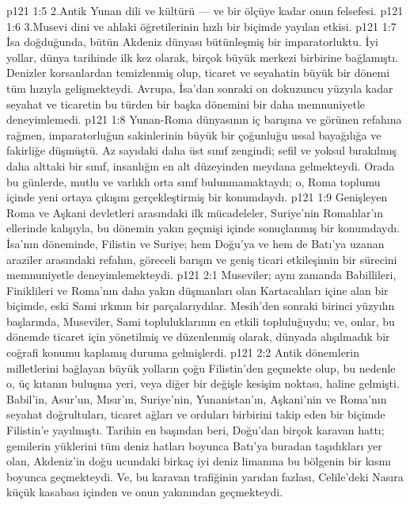 \vs p121 1:5 2.\bibnobreakspace Antik Yunan dili ve kültürü --- ve bir ölçüye kadar onun felsefesi.
\vs p121 1:6 3.\bibnobreakspace Musevi dini ve ahlaki öğretilerinin hızlı bir biçimde yayılan etkisi.
\vs p121 1:7 İsa doğduğunda, bütün Akdeniz dünyası bütünleşmiş bir imparatorluktu. İyi yollar, dünya tarihinde ilk kez olarak, birçok büyük merkezi birbirine bağlamıştı. Denizler korsanlardan temizlenmiş olup, ticaret ve seyahatin büyük bir dönemi tüm hızıyla gelişmekteydi. Avrupa, İsa’dan sonraki on dokuzuncu yüzyıla kadar seyahat ve ticaretin bu türden bir başka dönemini bir daha memnuniyetle deneyimlemedi.
\vs p121 1:8 Yunan\hyp{}Roma dünyasının iç barışına ve görünen refahına rağmen, imparatorluğun sakinlerinin büyük bir çoğunluğu ussal bayağılığa ve fakirliğe düşmüştü. Az sayıdaki daha üst sınıf zengindi; sefil ve yoksul bırakılmış daha alttaki bir sınıf, insanlığın en alt düzeyinden meydana gelmekteydi. Orada bu günlerde, mutlu ve varlıklı orta sınıf bulunmamaktaydı; o, Roma toplumu içinde yeni ortaya çıkışını gerçekleştirmiş bir konumdaydı.
\vs p121 1:9 Genişleyen Roma ve Aşkani devletleri arasındaki ilk mücadeleler, Suriye’nin Romalılar’ın ellerinde kalışıyla, bu dönemin yakın geçmişi içinde sonuçlanmış bir konumdaydı. İsa’nın döneminde, Filistin ve Suriye; hem Doğu’ya ve hem de Batı’ya uzanan araziler arasındaki refahın, göreceli barışın ve geniş ticari etkileşimin bir sürecini memnuniyetle deneyimlemekteydi.
\vs p121 2:1 Museviler; aynı zamanda Babillileri, Finiklileri ve Roma’nın daha yakın düşmanları olan Kartacalıları içine alan bir biçimde, eski Sami ırkının bir parçalarıydılar. Mesih’den sonraki birinci yüzyılın başlarında, Museviler, Sami topluluklarının en etkili topluluğuydu; ve, onlar, bu dönemde ticaret için yönetilmiş ve düzenlenmiş olarak, dünyada alışılmadık bir coğrafi konumu kaplamış duruma gelmişlerdi.
\vs p121 2:2 Antik dönemlerin milletlerini bağlayan büyük yolların çoğu Filistin’den geçmekte olup, bu nedenle o, üç kıtanın buluşma yeri, veya diğer bir değişle kesişim noktası, haline gelmişti. Babil’in, Asur’un, Mısır’ın, Suriye’nin, Yunanistan’ın, Aşkani’nin ve Roma’nın seyahat doğrultuları, ticaret ağları ve orduları birbirini takip eden bir biçimde Filistin’e yayılmıştı. Tarihin en başından beri, Doğu’dan birçok karavan hattı; gemilerin yüklerini tüm deniz hatları boyunca Batı’ya buradan taşıdıkları yer olan, Akdeniz’in doğu ucundaki birkaç iyi deniz limanına bu bölgenin bir kısmı boyunca geçmekteydi. Ve, bu karavan trafiğinin yarıdan fazlası, Celile’deki Nasıra küçük kasabası içinden ve onun yakınından geçmekteydi.
